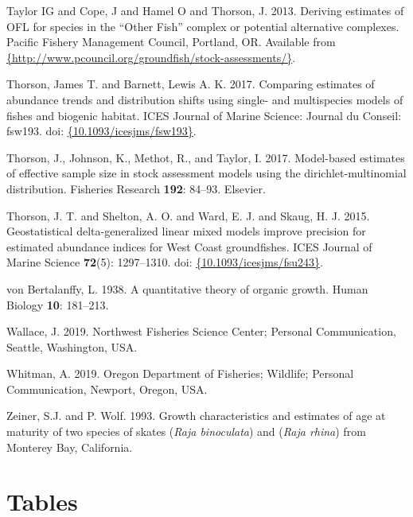 \documentclass[12pt,]{article}
\begin{document}
\leavevmode\hypertarget{ref-Taylor2013}{}%
Taylor IG and Cope, J and Hamel O and Thorson, J. 2013. Deriving
estimates of OFL for species in the ``Other Fish'' complex or potential
alternative complexes. Pacific Fishery Management Council, Portland, OR.
Available from
\href{\%7Bhttp://www.pcouncil.org/groundfish/stock-assessments/\%7D}{\{http://www.pcouncil.org/groundfish/stock-assessments/\}}.

\leavevmode\hypertarget{ref-Thorson2017a}{}%
Thorson, James T. and Barnett, Lewis A. K. 2017. Comparing estimates of
abundance trends and distribution shifts using single- and multispecies
models of fishes and biogenic habitat. ICES Journal of Marine Science:
Journal du Conseil: fsw193. doi:
\href{https://doi.org/\%7B10.1093/icesjms/fsw193\%7D}{\{10.1093/icesjms/fsw193\}}.

\leavevmode\hypertarget{ref-Thorson2017c}{}%
Thorson, J., Johnson, K., Methot, R., and Taylor, I. 2017. Model-based
estimates of effective sample size in stock assessment models using the
dirichlet-multinomial distribution. Fisheries Research \textbf{192}:
84--93. Elsevier.

\leavevmode\hypertarget{ref-Thorson2015}{}%
Thorson, J. T. and Shelton, A. O. and Ward, E. J. and Skaug, H. J. 2015.
Geostatistical delta-generalized linear mixed models improve precision
for estimated abundance indices for West Coast groundfishes. ICES
Journal of Marine Science \textbf{72}(5): 1297--1310. doi:
\href{https://doi.org/\%7B10.1093/icesjms/fsu243\%7D}{\{10.1093/icesjms/fsu243\}}.

\leavevmode\hypertarget{ref-VonB}{}%
von Bertalanffy, L. 1938. A quantitative theory of organic growth. Human
Biology \textbf{10}: 181--213.

\leavevmode\hypertarget{ref-Wallace2019}{}%
Wallace, J. 2019. Northwest Fisheries Science Center; Personal
Communication, Seattle, Washington, USA.

\leavevmode\hypertarget{ref-Whitman2019}{}%
Whitman, A. 2019. Oregon Department of Fisheries; Wildlife; Personal
Communication, Newport, Oregon, USA.

\leavevmode\hypertarget{ref-ZeinerWolf1993}{}%
Zeiner, S.J. and P. Wolf. 1993. Growth characteristics and estimates of
age at maturity of two species of skates (\emph{Raja binoculata}) and
(\emph{Raja rhina}) from Monterey Bay, California.

\newpage

\hypertarget{tables}{%
\section{Tables}\label{tables}}
\end{document}
